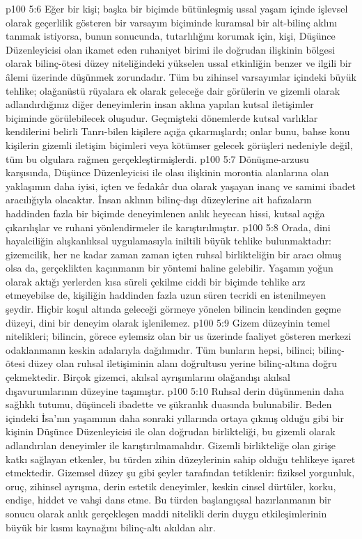 \vs p100 5:6 Eğer bir kişi; başka bir biçimde bütünleşmiş ussal yaşam içinde işlevsel olarak geçerlilik gösteren bir varsayım biçiminde kuramsal bir alt\hyp{}bilinç aklını tanımak istiyorsa, bunun sonucunda, tutarlılığını korumak için, kişi, Düşünce Düzenleyicisi olan ikamet eden ruhaniyet birimi ile doğrudan ilişkinin bölgesi olarak bilinç\hyp{}ötesi düzey niteliğindeki yükselen ussal etkinliğin benzer ve ilgili bir âlemi üzerinde düşünmek zorundadır. Tüm bu zihinsel varsayımlar içindeki büyük tehlike; olağanüstü rüyalara ek olarak geleceğe dair görülerin ve gizemli olarak adlandırdığınız diğer deneyimlerin insan aklına yapılan kutsal iletişimler biçiminde görülebilecek oluşudur. Geçmişteki dönemlerde kutsal varlıklar kendilerini belirli Tanrı\hyp{}bilen kişilere açığa çıkarmışlardı; onlar bunu, bahse konu kişilerin gizemli iletişim biçimleri veya kötümser gelecek görüşleri nedeniyle değil, tüm bu olgulara rağmen gerçekleştirmişlerdi.
\vs p100 5:7 Dönüşme\hyp{}arzusu karşısında, Düşünce Düzenleyicisi ile olası ilişkinin morontia alanlarına olan yaklaşımın daha iyisi, içten ve fedakâr dua olarak yaşayan inanç ve samimi ibadet aracılığıyla olacaktır. İnsan aklının bilinç\hyp{}dışı düzeylerine ait hafızaların haddinden fazla bir biçimde deneyimlenen anlık heyecan hissi, kutsal açığa çıkarılışlar ve ruhani yönlendirmeler ile karıştırılmıştır.
\vs p100 5:8 Orada, dini hayalciliğin alışkanlıksal uygulamasıyla iniltili büyük tehlike bulunmaktadır: gizemcilik, her ne kadar zaman zaman içten ruhsal birlikteliğin bir aracı olmuş olsa da, gerçeklikten kaçınmanın bir yöntemi haline gelebilir. Yaşamın yoğun olarak aktığı yerlerden kısa süreli çekilme ciddi bir biçimde tehlike arz etmeyebilse de, kişiliğin haddinden fazla uzun süren tecridi en istenilmeyen şeydir. Hiçbir koşul altında geleceği görmeye yönelen bilincin kendinden geçme düzeyi, dini bir deneyim olarak işlenilemez.
\vs p100 5:9 Gizem düzeyinin temel nitelikleri; bilincin, görece eylemsiz olan bir us üzerinde faaliyet gösteren merkezi odaklanmanın keskin adalarıyla dağılımıdır. Tüm bunların hepsi, bilinci; bilinç\hyp{}ötesi düzey olan ruhsal iletişiminin alanı doğrultusu yerine bilinç\hyp{}altına doğru çekmektedir. Birçok gizemci, akılsal ayrışımlarını olağandışı akılsal dışavurumlarının düzeyine taşımıştır.
\vs p100 5:10 Ruhsal derin düşünmenin daha sağlıklı tutumu, düşünceli ibadette ve şükranlık duasında bulunabilir. Beden içindeki İsa’nın yaşamının daha sonraki yıllarında ortaya çıkmış olduğu gibi bir kişinin Düşünce Düzenleyicisi ile olan doğrudan birlikteliği, bu gizemli olarak adlandırılan deneyimler ile karıştırılmamalıdır. Gizemli birlikteliğe olan girişe katkı sağlayan etkenler, bu türden zihin düzeylerinin sahip olduğu tehlikeye işaret etmektedir. Gizemsel düzey şu gibi şeyler tarafından tetiklenir: fiziksel yorgunluk, oruç, zihinsel ayrışma, derin estetik deneyimler, keskin cinsel dürtüler, korku, endişe, hiddet ve vahşi dans etme. Bu türden başlangıçsal hazırlanmanın bir sonucu olarak anlık gerçekleşen maddi nitelikli derin duygu etkileşimlerinin büyük bir kısmı kaynağını bilinç\hyp{}altı akıldan alır.
